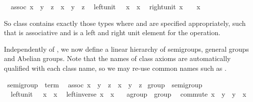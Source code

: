 \begin{isabellebody}
\ \ assoc{\isacharcolon}\ {\isachardoublequote}{\isacharparenleft}x\ {\isasymodot}\ y{\isacharparenright}\ {\isasymodot}\ z\ {\isacharequal}\ x\ {\isasymodot}\ {\isacharparenleft}y\ {\isasymodot}\ z{\isacharparenright}{\isachardoublequote}\isanewline
\ \ left{\isacharunderscore}unit{\isacharcolon}\ {\isachardoublequote}{\isasymunit}\ {\isasymodot}\ x\ {\isacharequal}\ x{\isachardoublequote}\isanewline
\ \ right{\isacharunderscore}unit{\isacharcolon}\ {\isachardoublequote}x\ {\isasymodot}\ {\isasymunit}\ {\isacharequal}\ x{\isachardoublequote}\isamarkupfalse%
%
\begin{isamarkuptext}%
\noindent So class  contains exactly those types \isa{{\isasymtau}} where \isa{{\isasymodot}\ {\isasymColon}\ {\isasymtau}\ {\isasymRightarrow}\ {\isasymtau}\ {\isasymRightarrow}\ {\isasymtau}} and \isa{{\isasymunit}\ {\isasymColon}\ {\isasymtau}} are
 specified appropriately, such that \isa{{\isasymodot}} is associative and
 \isa{{\isasymunit}} is a left and right unit element for the \isa{{\isasymodot}}
 operation.%
\end{isamarkuptext}%
\isamarkuptrue%
%
\begin{isamarkuptext}%
\medskip Independently of , we now define a linear
 hierarchy of semigroups, general groups and Abelian groups.  Note
 that the names of class axioms are automatically qualified with each
 class name, so we may re-use common names such as .%
\end{isamarkuptext}%
\isamarkuptrue%
\ semigroup\ {\isasymsubseteq}\ {\isachardoublequote}term{\isachardoublequote}\isanewline
\ \ assoc{\isacharcolon}\ {\isachardoublequote}{\isacharparenleft}x\ {\isasymodot}\ y{\isacharparenright}\ {\isasymodot}\ z\ {\isacharequal}\ x\ {\isasymodot}\ {\isacharparenleft}y\ {\isasymodot}\ z{\isacharparenright}{\isachardoublequote}\isanewline
\isanewline
\isamarkupfalse%
\ group\ {\isasymsubseteq}\ semigroup\isanewline
\ \ left{\isacharunderscore}unit{\isacharcolon}\ {\isachardoublequote}{\isasymunit}\ {\isasymodot}\ x\ {\isacharequal}\ x{\isachardoublequote}\isanewline
\ \ left{\isacharunderscore}inverse{\isacharcolon}\ {\isachardoublequote}x{\isasyminv}\ {\isasymodot}\ x\ {\isacharequal}\ {\isasymunit}{\isachardoublequote}\isanewline
\isanewline
\isamarkupfalse%
\ agroup\ {\isasymsubseteq}\ group\isanewline
\ \ commute{\isacharcolon}\ {\isachardoublequote}x\ {\isasymodot}\ y\ {\isacharequal}\ y\ {\isasymodot}\ x{\isachardoublequote}\isamarkupfalse%
%
\begin{isamarkuptext}%

\end{isamarkuptext}
\end{isabellebody}

